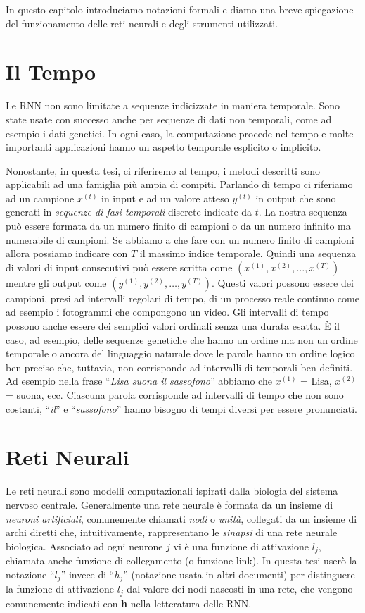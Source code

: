 In questo capitolo introduciamo notazioni formali e diamo una breve spiegazione
del funzionamento delle reti neurali e degli strumenti utilizzati.

\section{Il Tempo}

Le RNN non sono limitate a sequenze indicizzate in maniera temporale.
Sono state usate con successo anche per sequenze di dati non temporali,
come ad esempio i dati genetici. In ogni caso, la computazione procede nel tempo
e molte importanti applicazioni hanno un aspetto temporale esplicito o implicito.

Nonostante, in questa tesi, ci riferiremo al tempo, i metodi descritti sono
applicabili ad una famiglia pi\`u ampia di compiti. Parlando di tempo ci riferiamo
ad un campione $x^{(t)}$ in input e ad un valore atteso $y^{(t)}$ in output che
sono generati in \emph{sequenze di fasi temporali} discrete indicate da $t$.
La nostra sequenza pu\`o essere formata da un numero finito di campioni o da un
numero infinito ma numerabile di campioni. Se abbiamo a che fare con un numero
finito di campioni allora possiamo indicare con $T$ il massimo indice temporale.
Quindi una sequenza di valori di input consecutivi pu\`o essere scritta come
$(x^{(1)}, x^{(2)}, \dots, x^{(T)})$ mentre gli output come
$(y^{(1)}, y^{(2)}, \dots, y^{(T)})$. Questi valori possono essere dei campioni,
presi ad intervalli regolari di tempo, di un processo reale continuo come ad
esempio i fotogrammi che compongono un video. Gli intervalli di tempo possono
anche essere dei semplici valori ordinali senza una durata esatta. \`E il caso,
ad esempio, delle sequenze genetiche che hanno un ordine ma non un ordine
temporale o ancora del linguaggio naturale dove le parole hanno un ordine logico
ben preciso che, tuttavia, non corrisponde ad intervalli di temporali ben definiti.
Ad esempio nella frase ``\emph{Lisa suona il sassofono}'' abbiamo
che $x^{(1)}$ = Lisa, $x^{(2)}$ = suona, ecc. Ciascuna parola corrisponde ad
intervalli di tempo che non sono costanti, ``\emph{il}'' e ``\emph{sassofono}''
hanno bisogno di tempi diversi per essere pronunciati.

\section{Reti Neurali}
Le reti neurali sono modelli computazionali ispirati dalla biologia del sistema
nervoso centrale. Generalmente una rete neurale \`e formata da un insieme di
\emph{neuroni artificiali}, comunemente chiamati \emph{nodi} o \emph{unit\`a},
collegati da un insieme di archi diretti che, intuitivamente, rappresentano le
\emph{sinapsi} di una rete neurale biologica. Associato ad ogni neurone $j$ vi
\`e una funzione di attivazione $l_j$, chiamata anche funzione di collegamento
(o funzione link). In questa tesi user\`o la notazione ``$l_j$'' invece
di ``$h_j$'' (notazione usata in altri documenti) per distinguere la funzione di
attivazione $l_j$ dal valore dei nodi nascosti in una rete, che vengono
comunemente indicati con \textbf{h} nella letteratura delle RNN.

